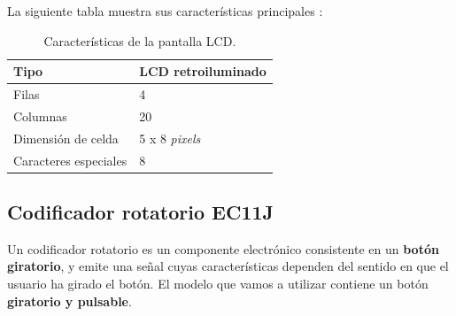 \smallskip

La siguiente tabla muestra sus características principales \cite{datasheet_lcd}:

\smallskip

\begin{table}[H]
	\begin{center}
		\begin{tabular}{|l|l|}
			\hline Tipo & \acrshort{LCD} retroiluminado \\ 
			\hline Filas & 4 \\ 
			\hline Columnas & 20 \\ 
			\hline Dimensión de celda & 5 x 8 \textit{pixels} \\ 
			\hline Caracteres especiales & 8 \\ 
			\hline 
		\end{tabular}
		\smallskip
		\caption{\label{tab:info_lcd} Características de la pantalla LCD.}
	\end{center}
\end{table}

\smallskip

\subsection{Codificador rotatorio EC11J}
\label{subsec:rotary}

Un codificador rotatorio es un componente electrónico consistente en un \textbf{botón giratorio}, y emite una señal cuyas características dependen del sentido en que el usuario ha girado el botón. El modelo que vamos a utilizar contiene un botón \textbf{giratorio y pulsable}. \cite{rotary}

\smallskip

